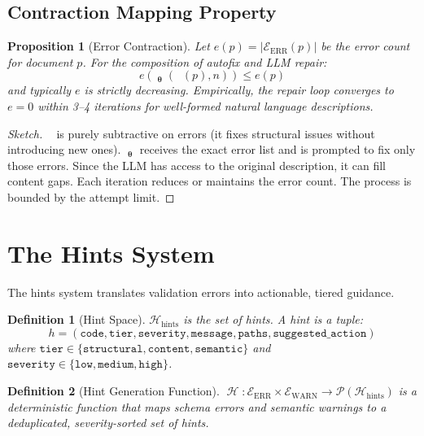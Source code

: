 \documentclass[11pt,a4paper]{article}
\newtheorem{definition}{Definition}[section]
\newtheorem{proposition}{Proposition}[section]
\theoremstyle{definition}
\DeclareMathOperator{\AutofixMulti}{\mathcal{A}^*}
\DeclareMathOperator{\RepairLLM}{\mathcal{R}_{\bm\theta}}
\DeclareMathOperator{\Hints}{\mathcal{H}}
\newcommand{\errs}{\mathcal{E}_{\text{ERR}}}
\newcommand{\warns}{\mathcal{E}_{\text{WARN}}}
\newcommand{\hintspace}{\mathcal{H}_{\text{hints}}}
\begin{document}
\subsection{Contraction Mapping Property}
\begin{proposition}[Error Contraction]
Let $e(p) = |\errs(p)|$ be the error count for document $p$. For the composition of autofix and LLM repair:
\begin{equation}
e(\RepairLLM_{\bm\theta}(\AutofixMulti(p), n)) \leq e(p)
\end{equation}
and typically $e$ is strictly decreasing. Empirically, the repair loop converges to $e = 0$ within 3--4 iterations for well-formed natural language descriptions.
\end{proposition}

\begin{proof}[Sketch]
$\AutofixMulti$ is purely subtractive on errors (it fixes structural issues without introducing new ones). $\RepairLLM_{\bm\theta}$ receives the exact error list and is prompted to fix only those errors. Since the LLM has access to the original description, it can fill content gaps. Each iteration reduces or maintains the error count. The process is bounded by the attempt limit.
\end{proof}

\section{The Hints System}

The hints system translates validation errors into actionable, tiered guidance.

\begin{definition}[Hint Space]
$\hintspace$ is the set of hints. A hint is a tuple:
\begin{equation}
h = (\texttt{code}, \texttt{tier}, \texttt{severity}, \texttt{message}, \texttt{paths}, \texttt{suggested\_action})
\end{equation}
where $\texttt{tier} \in \{\texttt{structural}, \texttt{content}, \texttt{semantic}\}$ and $\texttt{severity} \in \{\texttt{low}, \texttt{medium}, \texttt{high}\}$.
\end{definition}

\begin{definition}[Hint Generation Function]
$\Hints : \errs \times \warns \to \mathcal{P}(\hintspace)$ is a deterministic function that maps schema errors and semantic warnings to a deduplicated, severity-sorted set of hints.
\end{definition}
\end{document}

